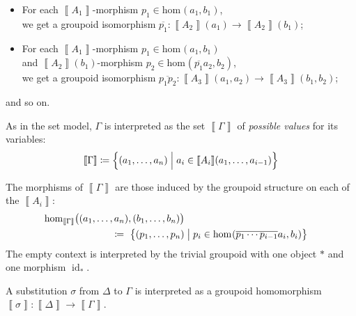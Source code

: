 \documentclass{article}
\theoremstyle{definition}
\renewcommand{\int}[1]{\mathopen{}\left\llbracket #1
    \right\rrbracket\mathclose{}}       %
\renewcommand{\hom}[3][]{\mathrm{hom}_{#1}\mathopen{}\left( #2, #3 \right)\mathclose{}}
\newcommand{\gfunc}[1]{\overline{#1}}
\DeclareMathOperator{\id}{id}				    %
\newcommand{\defeq}{
	\mathrel{\mathrel{\mathop:}\mkern-1.2mu=}}	%
\newcommand{\n}{%
}                %
\begin{document}
\begin{itemize}
    \item For each $\int{A_1}$-morphism $p_1 \in \hom{a_1}{b_1}$,\\ we get a groupoid isomorphism $\gfunc{p_1}\colon \int{A_2}\n(a_1) \to \int{A_2}\n(b_1)$;
    
    \item For each $\int{A_1}$-morphism $p_1 \in \hom{a_1}{b_1}$\\ and $\int{A_2}\n(b_1)$-morphism $p_2 \in \hom{\gfunc{p_1} a_2}{b_2}$,\\ we get a groupoid isomorphism $\gfunc{p_1p_2}\colon \int{A_3}\n(a_1,a_2) \to \int{A_3}\n(b_1,b_2)$;
\end{itemize}
and so on.

As in the set model, $\Gamma$ is interpreted as the set $\int{\Gamma}$ of \textit{possible values} for its variables: $$\int{\Gamma} \defeq \Big\{ (a_1,\ldots,a_n) \mathrel{\Big|} a_i \in \int{A_i}\n(a_1,\ldots,a_{i-1}) \Big\}$$

The morphisms of $\int{\Gamma}$ are those induced by the groupoid structure on each of the $\int{A_i}$:
\begin{align*}
    \hom[\int{\Gamma}]{\big.(a_1,\ldots,a_n)}{(b_1,\ldots,b_n)}\\ \defeq\ \big\{ (p_1, \ldots, p_n)& \mathrel{\big|} p_i \in \hom{\gfunc{p_1 \cdots p_{i-1}} a_i}{b_i} \big\}
\end{align*}
The empty context is interpreted by the trivial groupoid with one object $*$ and one morphism $\id_{*}$.


A substitution $\sigma$ from $\Delta$ to $\Gamma$ is interpreted as a groupoid homomorphism $\int{\sigma}\colon \int{\Delta} \to \int{\Gamma}$.
\end{document}
